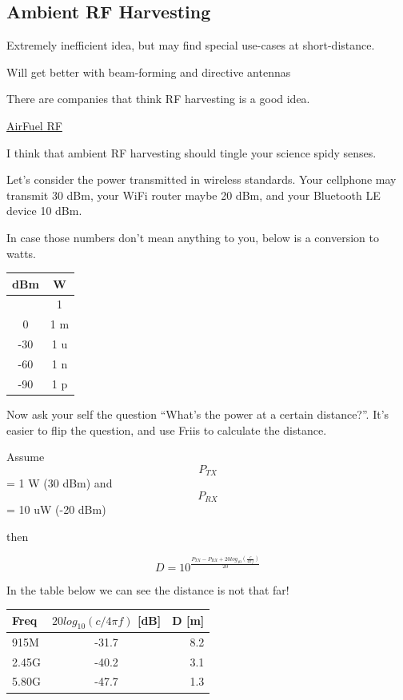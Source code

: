 \subsection{Ambient RF Harvesting}\label{ambient-rf-harvesting}

Extremely inefficient idea, but may find special use-cases at
short-distance.

Will get better with beam-forming and directive antennas

There are companies that think RF harvesting is a good idea.

\href{https://airfuel.org/airfuel-rf/}{AirFuel RF}

I think that ambient RF harvesting should tingle your science spidy
senses.

Let's consider the power transmitted in wireless standards. Your
cellphone may transmit 30 dBm, your WiFi router maybe 20 dBm, and your
Bluetooth LE device 10 dBm.

In case those numbers don't mean anything to you, below is a conversion
to watts.

\begin{longtable}[]{@{}cc@{}}
\toprule\noalign{}
dBm & W \\
\midrule\noalign{}
\endhead
\bottomrule\noalign{}
\endlastfoot
30 & 1 \\
0 & 1 m \\
-30 & 1 u \\
-60 & 1 n \\
-90 & 1 p \\
\end{longtable}

Now ask your self the question ``What's the power at a certain
distance?''. It's easier to flip the question, and use Friis to
calculate the distance.

Assume \[P_{TX}\] = 1 W (30 dBm) and \[P_{RX}\] = 10 uW (-20 dBm)

then

\[ D = 10^\frac{P_{TX} - P_{RX} + 20 log_{10}\left(\frac{c}{4 \pi f}\right)}{20} \]

In the table below we can see the distance is not that far!

\begin{longtable}[]{@{}lcr@{}}
\toprule\noalign{}
Freq & \textbf{\(20 log_{10}\left(c/4 \pi f\right)\)} {[}dB{]} & D
{[}m{]} \\
\midrule\noalign{}
\endhead
\bottomrule\noalign{}
\endlastfoot
915M & -31.7 & 8.2 \\
2.45G & -40.2 & 3.1 \\
5.80G & -47.7 & 1.3 \\
\end{longtable}

